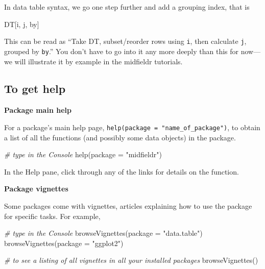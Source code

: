 \documentclass[
]{book}
\newenvironment{Shaded}{\begin{snugshade}}{\end{snugshade}}
\newcommand{\AttributeTok}[1]{\textcolor[rgb]{0.77,0.63,0.00}{#1}}
\newcommand{\CommentTok}[1]{\textcolor[rgb]{0.56,0.35,0.01}{\textit{#1}}}
\newcommand{\FunctionTok}[1]{\textcolor[rgb]{0.00,0.00,0.00}{#1}}
\newcommand{\NormalTok}[1]{#1}
\newcommand{\StringTok}[1]{\textcolor[rgb]{0.31,0.60,0.02}{#1}}
\begin{document}
In data table syntax, we go one step further and add a grouping index, that is

\begin{Shaded}
\begin{Highlighting}[]
\NormalTok{DT[i, j, by]}
\end{Highlighting}
\end{Shaded}

This can be read as ``Take DT, subset/reorder rows using \texttt{i}, then calculate \texttt{j}, grouped by \texttt{by}.'' You don't have to go into it any more deeply than this for now---we will illustrate it by example in the midfieldr tutorials.

\hypertarget{to-get-help}{%
\subsection{To get help}\label{to-get-help}}

\textbf{Package main help}

For a package's main help page, \texttt{help(package\ =\ "name\_of\_package")}, to obtain a list of all the functions (and possibly some data objects) in the package.

\begin{Shaded}
\begin{Highlighting}[]
\CommentTok{\# type in the Console}
\FunctionTok{help}\NormalTok{(}\AttributeTok{package =} \StringTok{"midfieldr"}\NormalTok{)}
\end{Highlighting}
\end{Shaded}

In the Help pane, click through any of the links for details on the function.

\textbf{Package vignettes}

Some packages come with vignettes, articles explaining how to use the package for specific tasks. For example,

\begin{Shaded}
\begin{Highlighting}[]
\CommentTok{\# type in the Console}
\FunctionTok{browseVignettes}\NormalTok{(}\AttributeTok{package =} \StringTok{"data.table"}\NormalTok{)}
\FunctionTok{browseVignettes}\NormalTok{(}\AttributeTok{package =} \StringTok{"ggplot2"}\NormalTok{)}

\CommentTok{\# to see a listing of all vignettes in all your installed packages}
\FunctionTok{browseVignettes}\NormalTok{()}
\end{Highlighting}
\end{Shaded}
\end{document}

